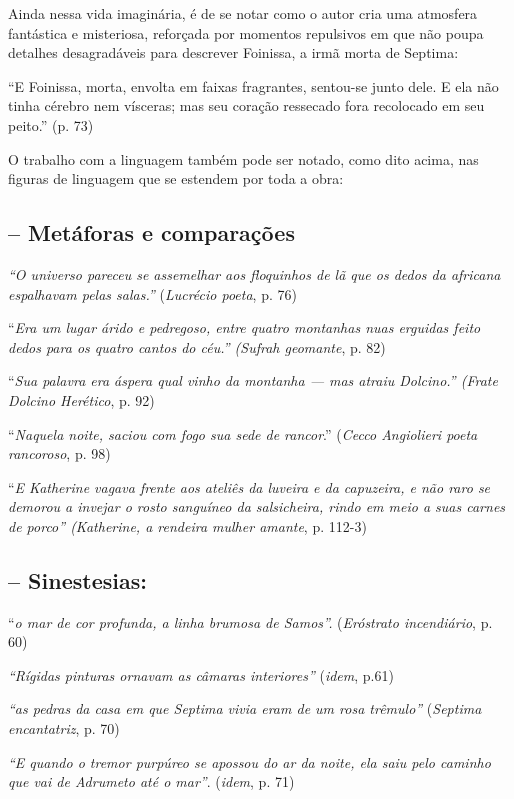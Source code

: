 \documentclass[12pt]{extarticle}
\begin{document}
Ainda nessa vida imaginária, é de se notar como o autor cria uma
atmosfera fantástica e misteriosa, reforçada por momentos repulsivos em
que não poupa detalhes desagradáveis para descrever Foinissa, a irmã
morta de Septima:

``E Foinissa, morta, envolta em faixas fragrantes, sentou-se junto dele.
E ela não tinha cérebro nem vísceras; mas seu coração ressecado fora
recolocado em seu peito.'' (p. 73)

O trabalho com a linguagem também pode ser notado, como dito acima, nas
figuras de linguagem que se estendem por toda a obra:


\subsection{-- Metáforas e comparações}

\emph{``O universo pareceu se assemelhar aos floquinhos de lã que os
dedos da africana espalhavam pelas salas.''} (\emph{Lucrécio poeta}, p.
76)

``\emph{Era um lugar árido e pedregoso, entre quatro montanhas nuas
erguidas feito dedos para os quatro cantos do céu.'' (Sufrah geomante},
p. 82)

``\emph{Sua palavra era áspera qual vinho da montanha --- mas atraiu
Dolcino.'' (Frate Dolcino Herético}, p. 92)

``\emph{Naquela noite, saciou com fogo sua sede de rancor}.''
(\emph{Cecco Angiolieri poeta rancoroso}, p. 98)

``\emph{E Katherine vagava frente aos ateliês da luveira e da capuzeira,
e não raro se demorou a invejar o rosto sanguíneo da salsicheira, rindo
em meio a suas carnes de porco'' (Katherine, a rendeira mulher amante},
p. 112-3)


\subsection{-- Sinestesias:}

``\emph{o mar de cor profunda, a linha brumosa de Samos''.}
(\emph{Eróstrato incendiário}, p. 60)

\emph{``Rígidas pinturas ornavam as câmaras interiores''} (\emph{idem},
p.61)

\emph{``as pedras da casa em que Septima vivia eram de um rosa
trêmulo''} (\emph{Septima encantatriz}, p. 70)

\emph{``E quando o tremor purpúreo se apossou do ar da noite, ela saiu
pelo caminho que vai de Adrumeto até o mar''}. (\emph{idem}, p. 71)
\end{document}
